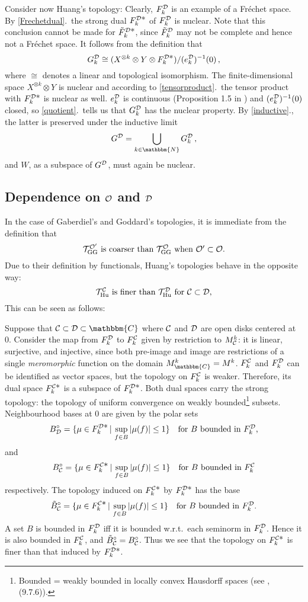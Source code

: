 \documentclass[a4paper,12pt,twoside]{article}
\renewcommand{\c}[1]{{\cal #1}}
\newcommand{\bN}{\mathbbm{N}}
\newcommand{\bC}{\mathbbm{C}}
\newcommand{\cT}{{\cal T}}
\newcommand{\pf}{{\it Proof.}\hspace{2ex}}
\newcommand{\pt}[1]{\ref{#1}.}
\renewcommand{\O}{\c{O}}
\newcommand{\C}{\c{C}}
\newcommand{\D}{\c{D}}
\newcommand{\Hu}{{\rm Hu}}
\newcommand{\GG}{{\rm GG}}
\newcommand{\THuc}{\cT_{\Hu}^{\C}}
\newcommand{\THud}{\cT_{\Hu}^{\D}}
\newcommand{\TGG}{\cT_{\GG}^{\O}}
\newcommand{\TGGp}{\cT_{\GG}^{{\O}'}}
\newcommand{\Fc}{F^{\C}_k}
\newcommand{\Fd}{F^{\D}_k}
\newcommand{\hF}{\tilde{F}}
\newcommand{\hFd}{\hF^{\D}_k}
\newcommand{\Fcd}{F^{\C{\textstyle *}}_k}
\newcommand{\Fdd}{F^{\D{\textstyle *}}_k}
\newcommand{\hFdd}{\hF^{\D{\textstyle *}}_k}
\newcommand{\Mc}{M^k_{\C}}
\newcommand{\MC}{M^k_{\bC}}
\newcommand{\ed}{e_k^{\D}}
\newcommand{\Gdk}{G^{\D}_k}
\newcommand{\Gd}{G^{\D}}
\newcommand{\Bp}{B^{\circ}}
\newcommand{\Bpc}{\Bp_{\C}}
\newcommand{\Bpd}{\Bp_{\D}}
\newcommand{\tBpc}{\tilde{B}^{\circ}_{\C}}
\begin{document}
Consider now Huang's topology:
Clearly, $\Fd$ is an example of a Fr\'{e}chet space.
By \pt{Frechetdual}\ the strong dual $\Fdd$ of $\Fd$ is
nuclear. Note that this conclusion cannot be made for $\hFdd$, since
$\hFd$ may not be complete and hence not a Fr\'{e}chet space.
It follows from the definition that
$$\Gdk \cong (X^{\otimes k}\otimes Y\otimes\Fdd)/(\ed)^{-1}(0)\,,$$
where $\cong$ denotes a linear and topological isomorphism.
The finite-dimensional space $X^{\otimes k}\otimes Y$ is nuclear and
according to \pt{tensorproduct}\ the tensor product with $\Fdd$
is nuclear as well. $\ed$ is continuous (Proposition 1.5 in \cite{Huang})
and $(\ed)^{-1}(0)$ closed, so
\pt{quotient}\ tells us that $\Gdk$ has the nuclear property.
By \pt{inductive}, the latter is preserved under the inductive limit
$$\Gd = \bigcup_{k\in\bN}\Gdk\,,$$
and $W$, as a subspace of $\Gd$, must again be nuclear.
\subsection{Dependence on $\O$ and $\D$}
\label{Dependence_on_O_and_D}
In the case of Gaberdiel's and Goddard's topologies, it is immediate
from the definition that
$$\mbox{$\TGGp$ is coarser than $\TGG$ when $\O'\subset\O$.}$$
Due to their definition by functionals, Huang's topologies behave in the opposite way:
$$\mbox{$\THuc$ is finer than $\THud$ for $\C\subset\D$,}$$
This can be seen as follows:

\noindent\pf
Suppose that $\C\subset\D\subset\bC$ where $\C$ and $\D$ are open disks
centered at 0. Consider the map from $\Fd$ to $\Fc$ given by restriction
to $\Mc$: it is linear, surjective, and injective, since both pre-image and
image are restrictions of a single {\it meromorphic}
function on the domain $\MC = M^k$. $\Fc$ and $\Fd$ can be
identified as vector  spaces, but the topology on $\Fc$ is weaker. Therefore,
its dual space $\Fcd$ is a subspace of $\Fdd$. Both dual spaces carry the strong
topology: the topology of uniform convergence on weakly bounded\footnote{Bounded = weakly
bounded in locally convex Hausdorff spaces (see \cite{Narici}, (9.7.6)).} subsets.
Neighbourhood bases at 0 are given by the polar sets
$$\Bpd = \{\mu\in\Fdd\,|\,\sup_{f\in B} |\mu(f)| \le 1\}\quad\mbox{for $B$ bounded in $\Fd$,}$$
and
$$\Bpc = \{\mu\in\Fcd\,|\,\sup_{f\in B} |\mu(f)| \le 1\}\quad\mbox{for $B$ bounded in $\Fc$}$$
respectively.
The topology induced on $\Fcd$ by $\Fdd$ has the
base
$$\tBpc = \{\mu\in \Fcd\,|\,\sup_{f\in B} |\mu(f)| \le 1\}\quad\mbox{for $B$ bounded in $\Fd$.}$$
A set $B$ is bounded in $\Fd$ iff it is bounded w.r.t.\ each
seminorm in $\Fd$. Hence it is also bounded in $\Fc$, and $\tBpc = \Bpc$.
Thus we see that the topology on $\Fcd$ is finer than that induced
by $\Fdd$.
\end{document}
